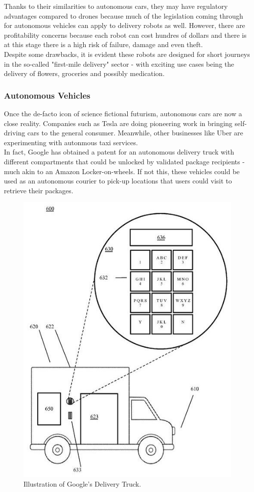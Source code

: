 \documentclass[a4paper,12pt,titlepage]{article}
\begin{document}
Thanks to their similarities to autonomous cars, they may have regulatory advantages compared to drones because much of the legislation coming through for autonomous vehicles can apply to delivery robots as well. However, there are profitability concerns because each robot can cost hundres of dollars and there is at this stage there is a high risk of failure, damage and even theft. \\

Despite some drawbacks, it is evident these robots are designed for short journeys in the so-called "first-mile delivery" sector - with exciting use cases being the delivery of flowers, groceries and possibly medication.

\subsubsection{Autonomous Vehicles}
Once the de-facto icon of science fictional futurism, autonomous cars are now a close reality. Companies such as Tesla are doing pioneering work in bringing self-driving cars\cite{Tesla2018} to the general consumer. Meanwhile, other businesses like Uber are experimenting with autonmous taxi services\cite{Gibbs2017}. \\

In fact, Google has obtained a patent for an autonomous delivery truck \cite{Hall-Geisler} with different compartments that could be unlocked by validated package recipients - much akin to an Amazon Locker-on-wheels. If not this, these vehicles could be used as an autonomous courier to pick-up locations that users could visit to retrieve their packages.

\begin{figure}[!hbpt]
  \center
  \includegraphics[width=0.4\linewidth]{img/google_truck_patent.jpeg}
  \caption{Illustration of Google's Delivery Truck. \cite{google_truck_patent}}
  \label{fig:google_truck_patent}
\end{figure}
\end{document}
